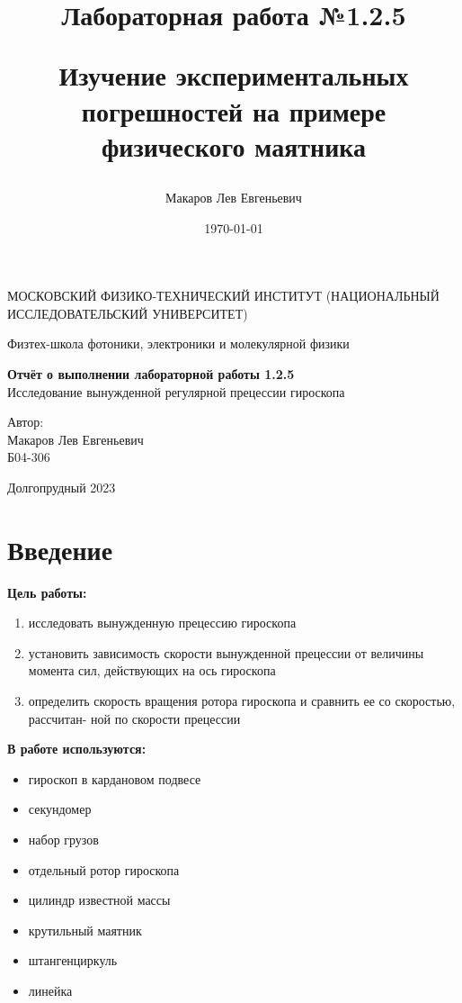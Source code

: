 \documentclass[a4paper,12pt]{article}
\author{Макаров Лев Евгеньевич}
\title{Лабораторная работа №1.2.5

Изучение экспериментальных погрешностей на примере физического маятника
}
\date{\today}
\begin{document}
\begin{titlepage}
	\begin{center}
		{\large МОСКОВСКИЙ ФИЗИКО-ТЕХНИЧЕСКИЙ ИНСТИТУТ (НАЦИОНАЛЬНЫЙ ИССЛЕДОВАТЕЛЬСКИЙ УНИВЕРСИТЕТ)}
	\end{center}
	\begin{center}
		{\large Физтех-школа фотоники, электроники и молекулярной физики}
	\end{center}
	
	
	\vspace{4.5cm}
	{\huge
		\begin{center}
			{\bf Отчёт о выполнении лабораторной работы 1.2.5}\\
			Исследование вынужденной регулярной прецессии гироскопа
		\end{center}
	}
	\vspace{2cm}
	\begin{flushright}
		{\LARGE Автор:\\ Макаров Лев Евгеньевич \\
			\vspace{0.2cm}
			Б04-306}
	\end{flushright}
	\vspace{8cm}
	\begin{center}
		Долгопрудный 2023
	\end{center}
\end{titlepage}

\section{Введение}

\textbf{Цель работы:} 
\begin{enumerate}
	\item исследовать вынужденную прецессию гироскопа
	\item установить зависимость скорости вынужденной прецессии от величины момента сил, действующих на ось гироскопа
        \item определить скорость вращения ротора гироскопа и сравнить ее со скоростью, рассчитан- ной по скорости прецессии
\end{enumerate}

\textbf{В работе используются:} 
\begin{itemize}
    \item гироскоп в кардановом подвесе
    \item секундомер
    \item набор грузов
    \item отдельный ротор гироскопа
    \item цилиндр известной массы
    \item крутильный маятник
    \item штангенциркуль
    \item линейка
\end{itemize}
\medskip
\end{document}
